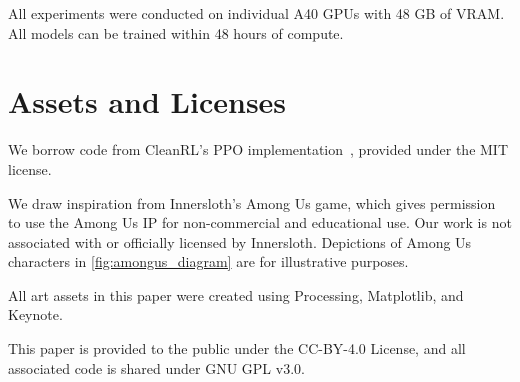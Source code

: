 All experiments were conducted on individual A40 GPUs with 48 GB of VRAM. All models can be trained within 48 hours of compute.


\section{Assets and Licenses}
\label{app:license}

We borrow code from CleanRL's PPO implementation~\cite{huang2022cleanrl}, provided under the MIT license. 

We draw inspiration from Innersloth's Among Us game, which gives permission to use the Among Us IP for non-commercial and educational use. Our work is not associated with or officially licensed by Innersloth. Depictions of Among Us characters in \cref{fig:amongus_diagram} are for illustrative purposes.

All art assets in this paper were created using Processing, Matplotlib, and Keynote. 

This paper is provided to the public under the CC-BY-4.0 License, and all associated code is shared under GNU GPL v3.0.


